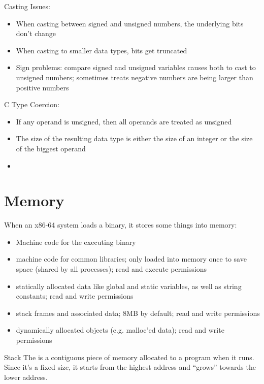 Casting Issues:
\begin{itemize}
    \item When casting between signed and unsigned numbers, the underlying bits don't change
    \item When casting to smaller data types, bits get truncated
    \item Sign problems: compare signed and unsigned variables causes both to cast to unsigned numbers; sometimes treats negative numbers are being larger than positive numbers
\end{itemize}

C Type Coercion:
\begin{itemize}
    \item If any operand is unsigned, then all operands are treated as unsigned
    \item The size of the resulting data type is either the size of an integer or the size of the biggest operand
    \item {}
\end{itemize}

\section{Memory}

When an x86-64 system loads a binary, it stores some things into memory:
\begin{itemize}
    \item {} Machine code for the executing binary
    \item {} machine code for common libraries; only loaded into memory once to save space (shared by all processes); read and execute permissions
    \item {} statically allocated data like global and static variables, as well as string constants; read and write permissions
    \item {} stack frames and associated data; 8MB by default; read and write permissions
    \item {} dynamically allocated objects (e.g. malloc'ed data); read and write permissions
\end{itemize}

\begin{dfnbox}{Stack}{}
    The  is a contiguous piece of memory allocated to a program when it runs. Since it's a fixed size, it starts from the highest address and ``grows'' towards the lower address.
\end{dfnbox}

